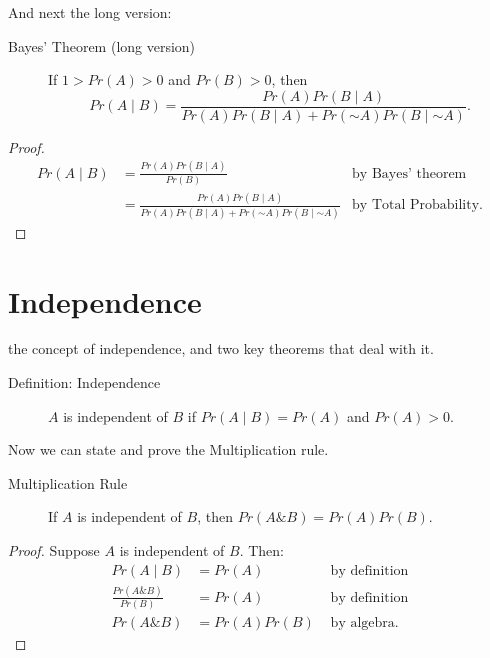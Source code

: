 \documentclass[justified]{tufte-book}
\newcommand{\given}{\mid}
\renewcommand{\neg}{\mathbin{\sim}}
\renewcommand{\wedge}{\mathbin{\&}}
\newcommand{\p}{Pr}
\theoremstyle{definition}
\theoremstyle{definition}
\theoremstyle{definition}
\theoremstyle{remark}
\let\BeginKnitrBlock\begin \let\EndKnitrBlock\end
\begin{document}
And next the long version:

\begin{description}
\item[Bayes' Theorem (long version)]
If \(1 > \p(A) > 0\) and \(\p(B)>0\), then
\[ \p(A \given B) = \frac{\p(A)\p(B \given A)}{\p(A)\p(B \given A) + \p(\neg A)\p(B \given \neg A)}. \]
\end{description}

\BeginKnitrBlock{proof}
{}
\[
  \begin{aligned}
    \p(A \given B) 
      &= \frac{\p(A)\p(B \given A)}{\p(B)} & \mbox{by Bayes' theorem}\\
      &= \frac{\p(A)\p(B \given A)}{\p(A)\p(B \given A) + \p(\neg A)\p(B \given \neg A)} & \mbox{by Total Probability.}
  \end{aligned}
\]
\EndKnitrBlock{proof}

\hypertarget{independence-1}{%
\section*{Independence}\label{independence-1}}

 the concept of independence, and two key theorems that deal with it.

\begin{description}
\item[Definition: Independence]
\(A\) is independent of \(B\) if \(\p(A \given B) = \p(A)\) and \(\p(A) > 0\).
\end{description}

Now we can state and prove the Multiplication rule.

\begin{description}
\item[Multiplication Rule]
If \(A\) is independent of \(B\), then \(\p(A \wedge B) = \p(A)\p(B)\).
\end{description}

\BeginKnitrBlock{proof}
{}
Suppose \(A\) is independent of \(B\). Then:
\[
  \begin{aligned}
    \p(A \given B) &= \p(A)                &  \mbox{ by definition}\\
    \frac{\p(A \wedge B)}{\p(B)} &= \p(A)  &  \mbox{ by definition}\\
    \p(A \wedge B) &= \p(A) \p(B)          &  \mbox{ by algebra.}
\end{aligned}
\]
\EndKnitrBlock{proof}
\end{document}
